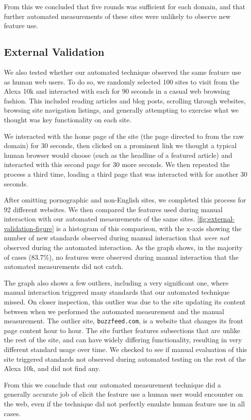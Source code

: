 From this we concluded that five rounds was sufficient for each domain, and
that further automated measurements of these sites were unlikely to observe new
feature use.


\subsection{External Validation}
\label{measurement:validity:external-validation}


We also tested whether our automated technique observed the same feature
use as human web users.   To do so, we randomly selected 100 sites to visit
from the Alexa 10k and interacted with each for 90 seconds in a casual
web browsing fashion.  This included reading articles and blog posts, scrolling
through websites, browsing site navigation listings, and generally attempting
to exercise what we thought was key functionality on each site.

We interacted with the home page of the site (the page directed to from the raw
domain) for 30 seconds, then clicked on a prominent link we thought a typical
human browser would choose (such as the headline of a featured article) and
interacted with this second page for 30 more seconds.  We then repeated the
process a third time, loading a third page that was interacted with for another
30 seconds.

After omitting pornographic and non-English sites, we completed this process
for 92 different websites. We then compared the features used during manual
interaction with our automated measurements of the same sites.
\ref{fig:external-validation-figure} is a histogram of this
comparison, with the x-axis showing the number of new standards
observed during manual interaction that \textit{were not} observed during
the automated interaction.  As the graph shows, in the majority of cases
(83.7\%), no features were observed during manual interaction that the
automated measurements did not catch.

The graph also shows a few outliers, including a very significant one, where
manual interaction triggered many standards that our automated technique
missed.  On closer inspection, this outlier was due to the site updating its
content between when we performed the automated measurement and the manual
measurement.  The outlier site, \texttt{buzzfeed.com}, is a website that
changes its front page content hour to hour.  The site further features
subsections that are unlike the rest of the site, and can have widely differing
functionality, resulting in very different standard usage over time. We checked
to see if manual evaluation of this site triggered standards not
observed during automated testing on the rest of the Alexa 10k, and did not
find any.

From this we conclude that our automated measurement technique did a generally
accurate job of elicit the feature use a human user would encounter on the web,
even if the technique did not perfectly emulate human feature use in all cases.
